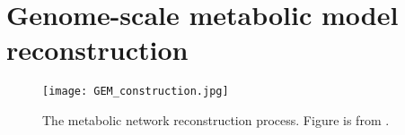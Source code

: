 \documentclass[a4paper, 11pt]{report}
\begin{document}
\setcounter{page}{4}























\newpage
\printbibliography[title={References}]
{}

% 

\appendix
\chapter{Genome-scale metabolic model reconstruction}
\begin{figure}[h]
    \centering
    \texttt{[image: GEM\_construction.jpg]}
    \caption{The metabolic network reconstruction process. Figure is from \cite{Thiele2010}.}
    \label{GEM reconstruction}
\end{figure}
\end{document}
